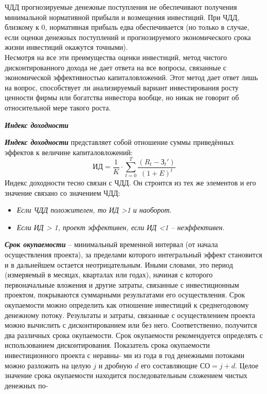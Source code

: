 \documentclass[a4paper,12pt]{article}
\begin{document}
ЧДД прогнозируемые денежные поступления не обеспечивают получения
минимальной нормативной прибыли и возмещения инвестиций. При ЧДД,
близкому к 0, нормативная прибыль едва обеспечивается (но только в
случае, если оценки денежных поступлений и прогнозируемого экономического срока жизни инвестиций окажутся точными).\\
Несмотря на все эти преимущества оценки инвестиций, метод чистого дисконтированного дохода не дает ответа на все вопросы, связанные с
экономической эффективностью капиталовложений. Этот метод дает ответ лишь на вопрос, способствует ли анализируемый вариант инвестирования росту ценности фирмы или богатства инвестора вообще, но никак
не говорит об относительной мере такого роста.
\begin{center}
	\textbf{\textit{Индекс доходности}}
\end{center}
\textbf{\textit{Индекс доходности}} представляет собой отношение суммы приведённых эффектов к величине капиталовложений:
\begin{equation}
	ИД = \frac{1}{K} \cdot {\sum_{t=0}^ T \frac{(R_t - {З_t} \prime)}{(1+E)^t}}
\end{equation}
Индекс доходности тесно связан с ЧДД. Он строится из тех же элементов и его значение связано со значением ЧДД:
\begin{itemize}
\item \textit{Если ЧДД положителен, то ИД >1 и наоборот}.
\item \textit{Если ИД > 1, проект эффективен, если ИД <1 – неэффективен}.
\end{itemize}
\textbf{\textit{Срок окупаемости}} – минимальный временной интервал (от начала осуществления проекта), за пределами которого интегральный эффект
становится и в дальнейшем остается неотрицательным. Иными словами,
это период (измеряемый в месяцах, кварталах или годах), начиная с которого первоначальные вложения и другие затраты, связанные с инвестиционным проектом, покрываются суммарными результатами его осуществления. Срок окупаемости можно определить как отношение инвестиций к
среднегодовому денежному потоку. Результаты и затраты, связанные с
осуществлением проекта можно вычислить с дисконтированием или без
него. Соответственно, получится два различных срока окупаемости. Срок
окупаемости рекомендуется определять с использованием дисконтирования.
\newpage
Показатель срока окупаемости инвестиционного проекта с неравны-
ми из года в год денежными потоками можно разложить на целую ${j}$ и
дробную ${d}$ его составляющие ${СО = j + d}$. Целое значение срока окупаемости находится последовательным сложением чистых денежных по-
\end{document}
